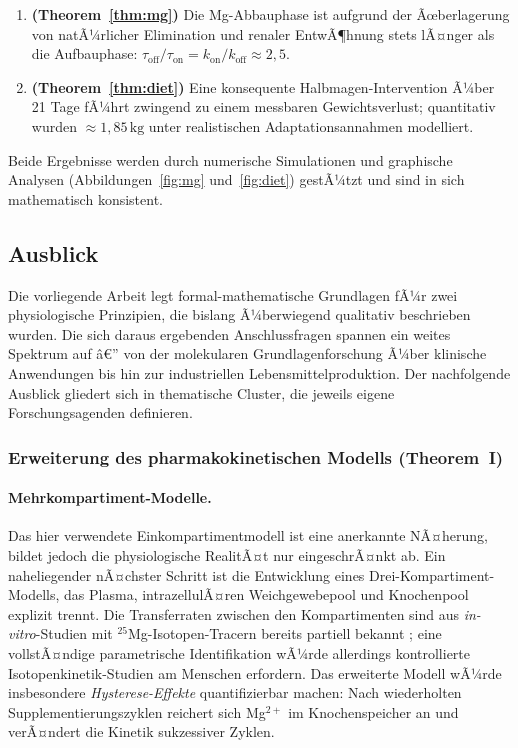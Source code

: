 ﻿\documentclass[12pt,a4paper]{article}
\theoremstyle{plain}
\theoremstyle{definition}
\theoremstyle{remark}
\begin{document}
\begin{enumerate}
  \item \textbf{(Theorem~\ref{thm:mg})} Die Mg-Abbauphase ist aufgrund der
        Ãœberlagerung von natÃ¼rlicher Elimination und renaler EntwÃ¶hnung stets
        lÃ¤nger als die Aufbauphase: $\tau_\text{off} / \tau_\text{on} =
        k_\text{on}/k_\text{off} \approx 2{,}5$.

  \item \textbf{(Theorem~\ref{thm:diet})} Eine konsequente Halbmagen-Intervention
        Ã¼ber 21 Tage fÃ¼hrt zwingend zu einem messbaren Gewichtsverlust;
        quantitativ wurden $\approx 1{,}85\,\text{kg}$ unter realistischen
        Adaptationsannahmen modelliert.
\end{enumerate}

Beide Ergebnisse werden durch numerische Simulationen und graphische Analysen
(Abbildungen~\ref{fig:mg} und~\ref{fig:diet}) gestÃ¼tzt und sind in sich
mathematisch konsistent.

\subsection{Ausblick}
\label{ssec:outlook}

Die vorliegende Arbeit legt formal-mathematische Grundlagen fÃ¼r zwei
physiologische Prinzipien, die bislang Ã¼berwiegend qualitativ beschrieben
wurden. Die sich daraus ergebenden Anschlussfragen spannen ein weites
Spektrum auf â€” von der molekularen Grundlagenforschung Ã¼ber klinische
Anwendungen bis hin zur industriellen Lebensmittelproduktion. Der
nachfolgende Ausblick gliedert sich in thematische Cluster, die jeweils
eigene Forschungsagenden definieren.

\subsubsection{Erweiterung des pharmakokinetischen Modells (Theorem~I)}

\paragraph{Mehrkompartiment-Modelle.}
Das hier verwendete Einkompartimentmodell ist eine anerkannte NÃ¤herung,
bildet jedoch die physiologische RealitÃ¤t nur eingeschrÃ¤nkt ab. Ein
naheliegender nÃ¤chster Schritt ist die Entwicklung eines
Drei-Kompartiment-Modells, das Plasma, intrazellulÃ¤ren
Weichgewebepool und Knochenpool explizit trennt. Die
Transferraten zwischen den Kompartimenten sind aus
\textit{in-vitro}-Studien mit ${}^{25}$Mg-Isotopen-Tracern bereits
partiell bekannt \cite{Schuchardt2017}; eine vollstÃ¤ndige parametrische
Identifikation wÃ¼rde allerdings kontrollierte Isotopenkinetik-Studien am
Menschen erfordern. Das erweiterte Modell wÃ¼rde insbesondere
\emph{Hysterese-Effekte} quantifizierbar machen: Nach wiederholten
Supplementierungszyklen reichert sich Mg$^{2+}$ im Knochenspeicher an und
verÃ¤ndert die Kinetik sukzessiver Zyklen.
\end{document}
